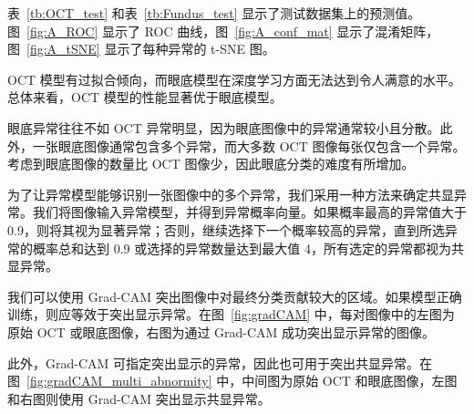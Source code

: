 \documentclass{article}
\begin{document}
\begin{multicols}{2}
		表~\ref{tb:OCT_test} 和表~\ref{tb:Fundus_test} 显示了测试数据集上的预测值。图~\ref{fig:A_ROC} 显示了 ROC 曲线，图~\ref{fig:A_conf_mat} 显示了混淆矩阵，图~\ref{fig:A_tSNE} 显示了每种异常的 t-SNE 图。
		
		OCT 模型有过拟合倾向，而眼底模型在深度学习方面无法达到令人满意的水平。总体来看，OCT 模型的性能显著优于眼底模型。
		
		眼底异常往往不如 OCT 异常明显，因为眼底图像中的异常通常较小且分散。此外，一张眼底图像通常包含多个异常，而大多数 OCT 图像每张仅包含一个异常。考虑到眼底图像的数量比 OCT 图像少，因此眼底分类的难度有所增加。
		
		为了让异常模型能够识别一张图像中的多个异常，我们采用一种方法来确定共显异常。我们将图像输入异常模型，并得到异常概率向量。如果概率最高的异常值大于 0.9，则将其视为显著异常；否则，继续选择下一个概率较高的异常，直到所选异常的概率总和达到 0.9 或选择的异常数量达到最大值 4，所有选定的异常都视为共显异常。
		
		\vspace{0.3cm}
		
		我们可以使用 Grad-CAM \autocite{Selvaraju_Cogswell_Das_Vedantam_Parikh_Batra}突出图像中对最终分类贡献较大的区域。如果模型正确训练，则应等效于突出显示异常。在图~\ref{fig:gradCAM} 中，每对图像中的左图为原始 OCT 或眼底图像，右图为通过 Grad-CAM 成功突出显示异常的图像。
		
		此外，Grad-CAM 可指定突出显示的异常，因此也可用于突出共显异常。在图~\ref{fig:gradCAM_multi_abnormity} 中，中间图为原始 OCT 和眼底图像，左图和右图则使用 Grad-CAM 突出显示共显异常。
	\end{multicols}
		
		
		
\end{document}
